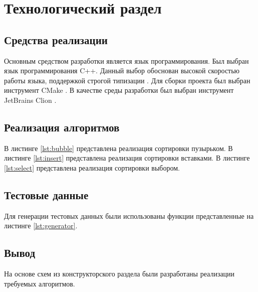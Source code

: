 \chapter{Технологический раздел}
\label{cha:impl}


\section{Средства реализации}


Основным средством разработки является язык программирования. Был выбран язык программирования C++. Данный выбор обоснован высокой скоростью работы языка, поддержкой строгой типизации \cite{cpplang}. Для сборки проекта был выбран инструмент CMake \cite{cmake}.  В качестве среды разработки был выбран инструмент JetBrains Clion \cite{clion}.


\section{Реализация алгоритмов}

В листинге \ref{lst:bubble} представлена реализация сортировки пузырьком.
В листинге \ref{lst:insert} представлена реализация сортировки вставками.
В листинге \ref{lst:select} представлена реализация сортировки выбором.





\section{Тестовые данные}

Для генерации тестовых данных были использованы функции представленные на листинге \ref{lst:generator}.




\section{Вывод}

На основе схем из конструкторского раздела были разработаны реализации требуемых алгоритмов.
